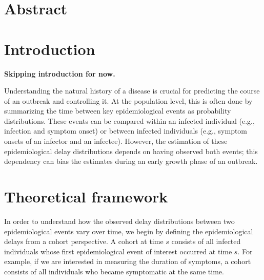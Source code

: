 \documentclass[12pt]{article}
\date{\today}
\begin{document}
\begin{flushleft}{
	\Large
	\textbf{}
}
\end{flushleft}

\section*{Abstract}

\pagebreak

\section{Introduction}


\textbf{Skipping introduction for now.}

Understanding the natural history of a disease is crucial for predicting the course of an outbreak and controlling it.
At the population level, this is often done by summarizing the time between key epidemiological events as probability distributions.
These events can be compared within an infected individual (e.g., infection and symptom onset) or between infected individuals (e.g., symptom onsets of an infector and an infectee).
However, the estimation of these epidemiological delay distributions depends on having observed both events;
this dependency can bias the estimates during an early growth phase of an outbreak.

\section{Theoretical framework}

In order to understand how the observed delay distributions between two epidemiological events vary over time, we begin by defining the epidemiological delays from a cohort perspective.
A cohort at time $s$ consists of all infected individuals whose first epidemiological event of interest occurred at time $s$.
For example, if we are interested in measuring the duration of symptoms, a cohort consists of all individuals who became symptomatic at the same time.
\end{document}
